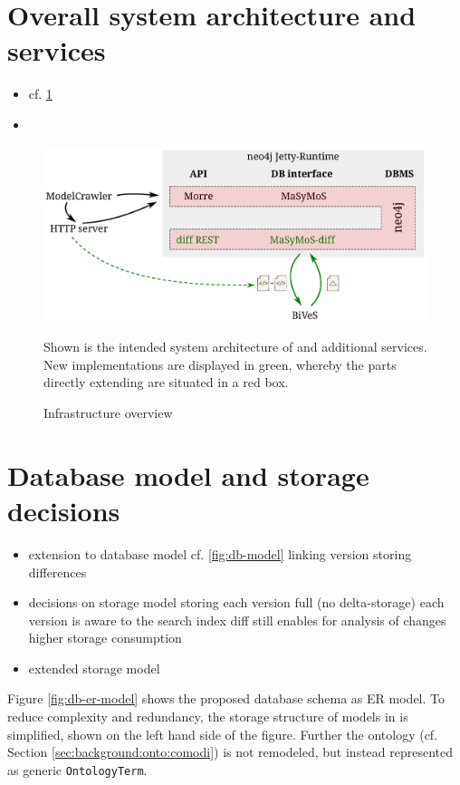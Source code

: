 \section{Overall system architecture and services}
\begin{itemize}
	\item cf. \ref{fig:system-overview}
	\item {}
\end{itemize}

\begin{figure}[h]
	\centering
	\includegraphics[width=\textwidth]{resources/system-overview-matrix.pdf}
	\caption{Infrastructure overview}
	\begin{flushleft}
		Shown is the intended system architecture of \masymos \neoj and additional services. New implementations are displayed in green, whereby the parts directly extending \neoj are situated in a red box.
	\end{flushleft}
	\label{fig:system-overview}
\end{figure}

\section{Database model and storage decisions}
\begin{itemize}
\item extension to database model cf. \ref{fig:db-model}
	\subitem linking version
	\subitem storing differences
\item decisions on storage model
	\subitem storing each version full (no delta-storage)
	\subitem each version is aware to the search index
	\subitem diff still enables for analysis of changes
	\subitem higher storage consumption
\item extended storage model
\end{itemize}
Figure \ref{fig:db-er-model} shows the proposed database schema as ER model. To reduce complexity and redundancy, the storage structure of models in \masymos is simplified, shown on the left hand side of the figure. Further the \comodi ontology (cf. Section \ref{sec:background:onto:comodi}) is not remodeled, but instead represented as generic \texttt{OntologyTerm}.

